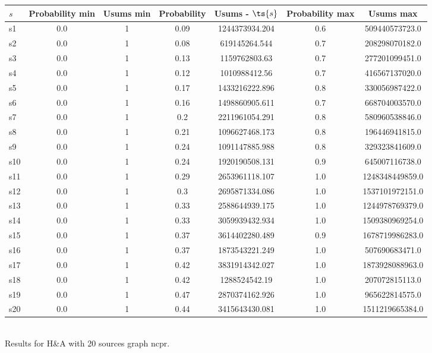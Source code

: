 \documentclass{article}
\begin{document}
\noindent\begin{tabular}{|l|c|c|c|c|c|c|}
\hline
$s$& Probability min & Usums min & Probability & Usums - $\ts{s}$ & Probability max & Usums max\\
\hline
s1 &0.0 & 1 & 0.09 & 1244373934.204 & 0.6 & 509440573723.0\\
\hline
s2 &0.0 & 1 & 0.08 & 619145264.544 & 0.7 & 208298070182.0\\
\hline
s3 &0.0 & 1 & 0.13 & 1159762803.63 & 0.7 & 277201099451.0\\
\hline
s4 &0.0 & 1 & 0.12 & 1010988412.56 & 0.7 & 416567137020.0\\
\hline
s5 &0.0 & 1 & 0.17 & 1433216222.896 & 0.8 & 330056987422.0\\
\hline
s6 &0.0 & 1 & 0.16 & 1498860905.611 & 0.7 & 668704003570.0\\
\hline
s7 &0.0 & 1 & 0.2 & 2211961054.291 & 0.8 & 580960538846.0\\
\hline
s8 &0.0 & 1 & 0.21 & 1096627468.173 & 0.8 & 196446941815.0\\
\hline
s9 &0.0 & 1 & 0.24 & 1091147885.988 & 0.8 & 329323841609.0\\
\hline
s10 &0.0 & 1 & 0.24 & 1920190508.131 & 0.9 & 645007116738.0\\
\hline
s11 &0.0 & 1 & 0.29 & 2653961118.107 & 1.0 & 1248348449859.0\\
\hline
s12 &0.0 & 1 & 0.3 & 2695871334.086 & 1.0 & 1537101972151.0\\
\hline
s13 &0.0 & 1 & 0.33 & 2588644939.175 & 1.0 & 1244978769379.0\\
\hline
s14 &0.0 & 1 & 0.33 & 3059939432.934 & 1.0 & 1509380969254.0\\
\hline
s15 &0.0 & 1 & 0.37 & 3614402280.489 & 0.9 & 1678719986283.0\\
\hline
s16 &0.0 & 1 & 0.37 & 1873543221.249 & 1.0 & 507690683471.0\\
\hline
s17 &0.0 & 1 & 0.42 & 3831914342.027 & 1.0 & 1873928088963.0\\
\hline
s18 &0.0 & 1 & 0.42 & 1288524542.19 & 1.0 & 207072815113.0\\
\hline
s19 &0.0 & 1 & 0.47 & 2870374162.926 & 1.0 & 965622814575.0\\
\hline
s20 &0.0 & 1 & 0.44 & 3415643430.081 & 1.0 & 1511219665384.0\\
\hline
\end{tabular}\\

\noindent Results for H\&A with 20 sources graph ncpr.
\end{document}
